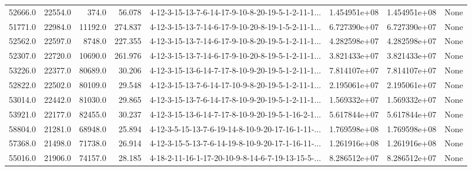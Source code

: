 \begin{tabular}{rrrrlrrl}
 52666.0 &  22554.0 &          374.0 &             56.078 &  4-12-3-15-13-7-6-14-17-9-10-8-20-19-5-1-2-11-1... &  1.454951e+08 &  1.454951e+08 &   None \\
 51771.0 &  22984.0 &        11192.0 &            274.837 &  4-12-3-15-13-7-14-6-17-9-10-20-8-19-1-5-2-11-1... &  6.727390e+07 &  6.727390e+07 &   None \\
 52562.0 &  22597.0 &         8748.0 &            227.355 &  4-12-3-15-13-7-14-6-17-9-10-8-20-19-5-1-2-11-1... &  4.282598e+07 &  4.282598e+07 &   None \\
 52307.0 &  22720.0 &        10690.0 &            261.976 &  4-12-3-15-13-7-14-6-17-9-10-20-8-19-5-1-2-11-1... &  3.821433e+07 &  3.821433e+07 &   None \\
 53226.0 &  22377.0 &        80689.0 &             30.206 &  4-12-3-15-13-6-14-7-17-8-10-9-20-19-5-1-2-11-1... &  7.814107e+07 &  7.814107e+07 &   None \\
 52822.0 &  22502.0 &        80109.0 &             29.548 &  4-12-3-15-13-7-6-14-17-10-9-8-20-19-5-1-2-11-1... &  2.195061e+07 &  2.195061e+07 &   None \\
 53014.0 &  22442.0 &        81030.0 &             29.865 &  4-12-3-15-13-7-6-14-17-8-10-9-20-19-5-1-2-11-1... &  1.569332e+07 &  1.569332e+07 &   None \\
 53921.0 &  22177.0 &        82455.0 &             30.237 &  4-12-3-15-13-6-14-7-17-8-10-9-20-19-5-1-16-2-1... &  5.617844e+07 &  5.617844e+07 &   None \\
 58804.0 &  21281.0 &        68948.0 &             25.894 &  4-12-3-5-15-13-7-6-19-14-8-10-9-20-17-16-1-11-... &  1.769598e+08 &  1.769598e+08 &   None \\
 57368.0 &  21498.0 &        71738.0 &             26.914 &  4-12-3-15-5-13-7-6-14-19-8-10-9-20-17-1-16-11-... &  1.261916e+08 &  1.261916e+08 &   None \\
 55016.0 &  21906.0 &        74157.0 &             28.185 &  4-18-2-11-16-1-17-20-10-9-8-14-6-7-19-13-15-5-... &  8.286512e+07 &  8.286512e+07 &   None \\
\bottomrule
\end{tabular}
